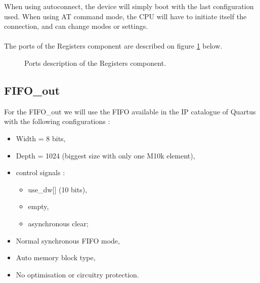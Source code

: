 \documentclass[11pt]{article}
\begin{document}
When using autoconnect, the device will simply boot with the last configuration used. When using AT command mode, the CPU will have to initiate itself the connection, and can change modes or settings.
\\\\
The ports of the Registers component are described on figure \ref{reg_ports} below.
\begin{figure}[H]
        \caption{Ports description of the Registers component.}
        \label{reg_ports}
\end{figure}

\subsection{FIFO\_out}
For the FIFO\_out we will use the FIFO available in the IP catalogue of Quartus with the following configurations :
\begin{itemize}
    \item Width = 8 bits,
    \item Depth = 1024 (biggest size with only one M10k element),
    \item control signals : \begin{itemize}
        \item use\_dw[] (10 bits),
        \item empty,
        \item asynchronous clear; \end{itemize}
    \item Normal synchronous FIFO mode,
    \item Auto memory block type,
    \item No optimisation or circuitry protection.
\end{itemize}
\end{document}

